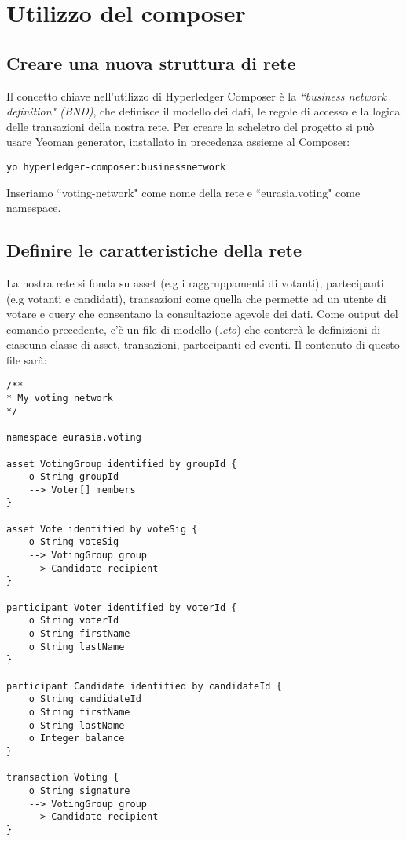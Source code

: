 \section{Utilizzo del composer}
	\subsection{Creare una nuova struttura di rete}
		Il concetto chiave nell'utilizzo di Hyperledger Composer è la \emph{``business network definition" (BND)}, che definisce il modello dei dati, le regole di accesso e la logica delle transazioni della nostra rete. Per creare la scheletro del progetto si può usare Yeoman generator, installato in precedenza assieme al Composer:
\begin{lstlisting}
yo hyperledger-composer:businessnetwork
\end{lstlisting}
		Inseriamo ``voting-network" come nome della rete e ``eurasia.voting" come namespace.
	\subsection{Definire le caratteristiche della rete}
		La nostra rete si fonda su asset (e.g i raggruppamenti di votanti), partecipanti (e.g votanti e candidati), transazioni come quella che permette ad un utente di votare e query che consentano la consultazione agevole dei dati. Come output del comando precedente, c'è un file di modello (\emph{.cto}) che conterrà le definizioni di ciascuna classe di asset, transazioni, partecipanti ed eventi. Il contenuto di questo file sarà:
\begin{lstlisting}
/**
* My voting network
*/

namespace eurasia.voting

asset VotingGroup identified by groupId {
	o String groupId
	--> Voter[] members
}

asset Vote identified by voteSig {
	o String voteSig
	--> VotingGroup group
	--> Candidate recipient
}

participant Voter identified by voterId {
	o String voterId
	o String firstName
	o String lastName
}

participant Candidate identified by candidateId {
	o String candidateId
	o String firstName
	o String lastName
	o Integer balance
}

transaction Voting {
	o String signature
	--> VotingGroup group
	--> Candidate recipient
}
\end{lstlisting}

